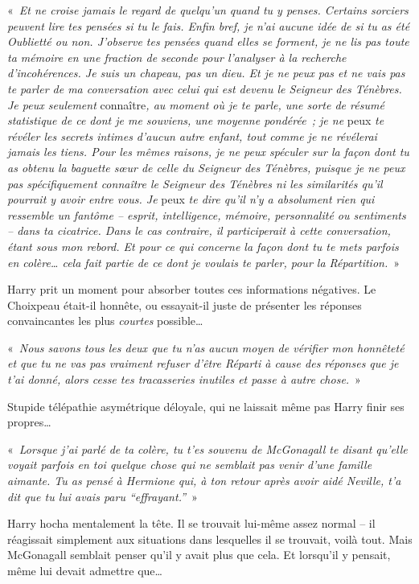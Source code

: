 «~\emph{Et ne croise jamais le regard de quelqu'un quand tu y penses.
Certains sorciers peuvent lire tes pensées si tu le fais.
Enfin bref, je n'ai aucune idée de si tu as été Oublietté ou non.
J'observe tes pensées quand elles se forment, je ne lis pas toute ta mémoire en une fraction de seconde pour l'analyser à la recherche d'incohérences.
Je suis un chapeau, pas un dieu.
Et je ne peux pas et ne vais pas te parler de ma conversation avec celui qui est devenu le Seigneur des Ténèbres.
Je peux seulement} connaître\emph{, au moment où je te parle, une sorte de résumé statistique de ce dont je me souviens, une moyenne pondérée~; je ne} peux \emph{te révéler les secrets intimes d'aucun autre enfant, tout comme je ne révélerai jamais les tiens.
Pour les mêmes raisons, je ne peux spéculer sur la façon dont tu as obtenu la baguette sœur de celle du Seigneur des Ténèbres, puisque je ne peux pas spécifiquement connaître le Seigneur des Ténèbres ni les similarités qu'il pourrait y avoir entre vous.
Je} peux \emph{te dire qu'il n'y a absolument rien qui ressemble un fantôme -- esprit, intelligence, mémoire, personnalité ou sentiments -- dans ta cicatrice.
Dans le cas contraire, il participerait à cette conversation, étant sous mon rebord.
Et pour ce qui concerne la façon dont tu te mets parfois en colère… cela fait partie de ce dont je voulais te parler, pour la Répartition.}~»

Harry prit un moment pour absorber toutes ces informations négatives.
Le Choixpeau était-il honnête, ou essayait-il juste de présenter les réponses convaincantes les plus \emph{courtes} possible…

«~\emph{Nous savons tous les deux que tu n'as aucun moyen de vérifier mon honnêteté et que tu ne vas pas vraiment refuser d'être Réparti à cause des réponses que je t'ai donné, alors cesse tes tracasseries inutiles et passe à autre chose.}~»

Stupide télépathie asymétrique déloyale, qui ne laissait même pas Harry finir ses propres…

«~\emph{Lorsque j'ai parlé de ta colère, tu t'es souvenu de McGonagall te disant qu'elle voyait parfois en toi quelque chose qui ne semblait pas venir d'une famille aimante.
Tu as pensé à Hermione qui, à ton retour après avoir aidé Neville, t'a dit que tu lui avais paru “effrayant.”}~»

Harry hocha mentalement la tête.
Il se trouvait lui-même assez normal -- il réagissait simplement aux situations dans lesquelles il se trouvait, voilà tout.
Mais McGonagall semblait penser qu'il y avait plus que cela.
Et lorsqu'il y pensait, même lui devait admettre que…

